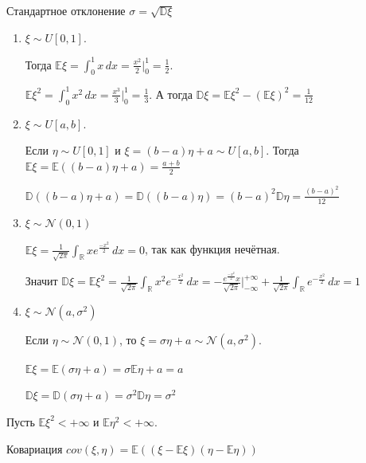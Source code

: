 \begin{definition}
    Стандартное отклонение $\sigma = \sqrt{\mathbb{D} \xi}$
\end{definition}

\begin{example}
    \begin{enumerate}
        \item {
            $\xi \sim U[0, 1]$.

            Тогда $\mathbb{E} \xi = \int_{0}^{1} x \, dx = \frac{x^2}{2} \bigg |_0^1 = \frac{1}{2}$.

            $\mathbb{E} \xi^2 = \int_{0}^{1} x^2 \, dx = \frac{x^3}{3} \bigg |_0^1 = \frac{1}{3}$. А тогда
            $\mathbb{D} \xi = \mathbb{E} \xi^2 - (\mathbb{E} \xi)^2 = \frac{1}{12}$
        }
        \item {
            $\xi \sim U[a, b]$.

            Если $\eta \sim U[0, 1]$ и $\xi = (b - a)\eta + a \sim U[a, b]$.
            Тогда $\mathbb{E} \xi = \mathbb{E} ((b - a) \eta  + a) = \frac{a + b}{2}$

            $\mathbb{D} ((b-a)\eta + a) = \mathbb{D} ((b - a)\eta) = (b-a)^2\mathbb{D}\eta = \frac{(b-a)^2}{12}$
        }
        \item {
            $\xi \sim \mathcal{N} (0, 1)$

            $\mathbb{E} \xi = \frac{1}{\sqrt{2\pi}} \int_{\mathbb{R}} xe^{\frac{-x^2}{2}} \, dx = 0$, так как функция нечётная.

            Значит $\mathbb{D} \xi = \mathbb{E} \xi ^2 = \frac{1}{\sqrt{2\pi}} \int_{\mathbb{R}} x^2 e^{-\frac{x^2}{2}} \, dx =
            -\frac{e^{\frac{-x^2}{2}}x}{\sqrt{2\pi}} \bigg |_{-\infty}^{+\infty} + \frac{1}{\sqrt{2\pi}} \int_{\mathbb{R}} e^{-\frac{x^2}{2}} \, dx = 1$
        }
        \item {
            $\xi \sim \mathcal{N}(a, \sigma^2)$

            Если $\eta \sim \mathcal{N}(0, 1)$, то $\xi = \sigma \eta + a \sim \mathcal{N}(a, \sigma^2)$.

            $\mathbb{E} \xi = \mathbb{E} (\sigma \eta + a) = \sigma \mathbb{E} \eta + a = a$

            $\mathbb{D} \xi = \mathbb{D} (\sigma \eta + a) = \sigma^2 \mathbb{D} \eta = \sigma^2$
        }
    \end{enumerate}
\end{example}

\begin{definition}
    Пусть $\mathbb{E} \xi^2 < +\infty$ и $\mathbb{E} \eta^2 < +\infty$.

    Ковариация $cov (\xi, \eta) = \mathbb{E} ((\xi - \mathbb{E}\xi)(\eta - \mathbb{E}\eta))$
\end{definition}

